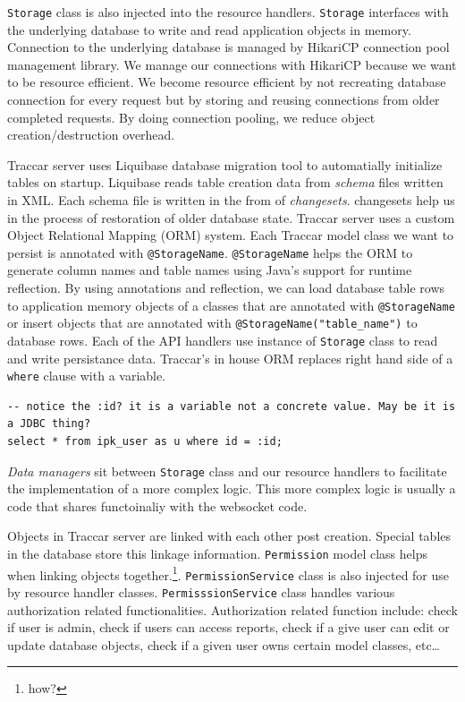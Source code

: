 \documentclass[a4paper]{article}
\begin{document}
\lstinline{Storage}  class is also injected into the resource handlers. \lstinline{Storage} interfaces with the underlying database 
to write and read application objects in memory. Connection to the underlying database is managed by HikariCP connection pool 
management library. We manage our connections with HikariCP because we want to be resource efficient. We become resource efficient by not 
recreating database connection for every request but by storing and reusing connections from older completed requests. By doing 
connection pooling, we reduce object creation/destruction overhead. 

Traccar server uses Liquibase database migration tool to automatially initialize tables on startup. Liquibase reads table creation 
data from \emph{schema} files written in XML. Each schema file is written in the from of \emph{changesets}. changesets help us in 
the process of restoration of older database state. Traccar server uses a custom Object Relational Mapping (ORM) system. 
Each Traccar model class we want to persist is annotated with \lstinline{@StorageName}. \lstinline{@StorageName} helps the ORM to 
generate column names and table names using Java's support for runtime reflection. By using annotations and reflection, we can load 
database table rows to application memory objects of a classes that are annotated with \lstinline{@StorageName} or insert objects that 
are annotated with \lstinline{@StorageName("table_name")} to database rows. Each of the API handlers use instance of  
\lstinline{Storage} class to read and write persistance data. Traccar's in house ORM replaces right hand side of a \lstinline{where} 
clause with a variable.

\begin{verbatim}
-- notice the :id? it is a variable not a concrete value. May be it is a JDBC thing?
select * from ipk_user as u where id = :id;
\end{verbatim}

\emph{Data managers} sit between \lstinline{Storage} class and our resource handlers to facilitate the 
implementation of a more complex logic. This more complex logic is usually a code that shares functoinaliy with the websocket code. 


Objects in Traccar server are linked with each other post creation. Special tables in the database store this linkage information. 
\lstinline{Permission} model class helps when linking objects together.\footnote{how?}. \lstinline{PermissionService} class is also injected 
for use by resource handler classes. \lstinline{PermisssionService} class handles various authorization related functionalities. 
Authorization related function include: check if user is admin, check if users can access reports, check if a give user can edit or 
update database objects, check if a given user owns certain model classes, etc\ldots
\end{document}
